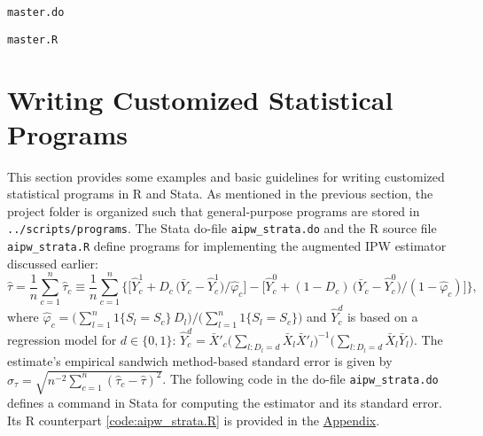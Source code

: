 \documentclass[12pt]{article}
\begin{document}
\vspace{5mm}

\lstset{basicstyle=\scriptsize\ttfamily,breaklines=true}

\noindent \texttt{master.do}



\lstset{basicstyle=\scriptsize\ttfamily,breaklines=true}

\noindent \texttt{master.R}



\clearpage


\section{Writing Customized Statistical Programs}

This section provides some examples and basic guidelines for writing customized statistical programs in R and Stata. As mentioned in the previous section, the project folder is organized such that general-purpose programs are stored in \texttt{../scripts/programs}. The Stata do-file \texttt{aipw\_strata.do} and the R source file \texttt{aipw\_strata.R} define programs for implementing the augmented IPW estimator discussed earlier: 
$$\widehat{\tau} = \frac{1}{n}\sum_{c = 1}^n \widehat{\tau}_c \equiv \frac{1}{n}\sum_{c = 1}^n \Big\{\big[\hat{Y}^1_c + D_c\,\big(\bar{Y}_c - \hat{Y}^1_c\big)/\hat{\varphi}_c\big] -\big[\hat{Y}^0_c + (1-D_c)\,\big(\bar{Y}_c - \hat{Y}^0_c\big)/(1 - \hat{\varphi}_c)\big]\Big\},$$
where $\hat{\varphi}_c =\big(\sum_{l = 1}^n 1\{S_l = S_c\}\,D_l\big)/\big(\sum_{l = 1}^n 1\{S_l = S_c\}\big)$ and $\hat{Y}^d_c$ is based on a regression model for $d \in \{0,1\}$: $\hat{Y}^d_c = \bar{X}'_c\big(\sum_{l: D_l = d} \bar{X}_l\bar{X}'_l\big)^{-1}\big(\sum_{l: D_l = d} \bar{X}_l\bar{Y}_l\big)$. The estimate's empirical sandwich method-based standard error is given by $\widehat{\sigma}_\tau = \sqrt{n^{-2}\sum_{c = 1}^n (\widehat{\tau}_c - \widehat{\tau})^2}$. The following code in the do-file \texttt{aipw\_strata.do} defines a command in Stata for computing the estimator and its standard error. Its R counterpart \ref{code:aipw_strata.R} is provided in the \hyperref[sec:appendix]{Appendix}.
\end{document}
